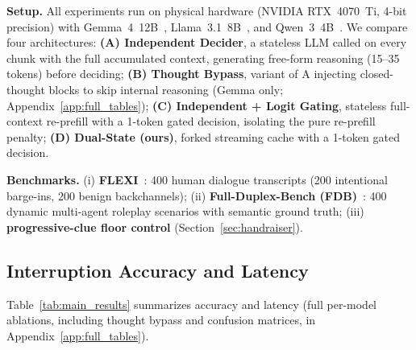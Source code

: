 \documentclass{article}
\begin{document}
\textbf{Setup.} All experiments run on physical hardware (NVIDIA RTX~4070~Ti, 4-bit precision) with Gemma~4~12B~\citep{gemmateam2026gemma4}, Llama~3.1~8B~\citep{grattafiori2024llama3}, and Qwen~3~4B~\citep{yang2025qwen3}. We compare four architectures: \textbf{(A) Independent Decider}, a stateless LLM called on every chunk with the full accumulated context, generating free-form reasoning (15--35 tokens) before deciding; \textbf{(B) Thought Bypass}, variant of A injecting closed-thought blocks to skip internal reasoning (Gemma only; Appendix~\ref{app:full_tables}); \textbf{(C) Independent + Logit Gating}, stateless full-context re-prefill with a 1-token gated decision, isolating the pure re-prefill penalty; \textbf{(D) Dual-State (ours)}, forked streaming cache with a 1-token gated decision.

\textbf{Benchmarks.} (i) \textbf{FLEXI}~\citep{ge2025flexi}: 400 human dialogue transcripts (200 intentional barge-ins, 200 benign backchannels); (ii) \textbf{Full-Duplex-Bench (FDB)}~\citep{lin2025fdbench}: 400 dynamic multi-agent roleplay scenarios with semantic ground truth; (iii) \textbf{progressive-clue floor control} (Section~\ref{sec:handraiser}).

\subsection{Interruption Accuracy and Latency}
\label{sec:accuracy}

Table~\ref{tab:main_results} summarizes accuracy and latency (full per-model ablations, including thought bypass and confusion matrices, in Appendix~\ref{app:full_tables}).
\end{document}
